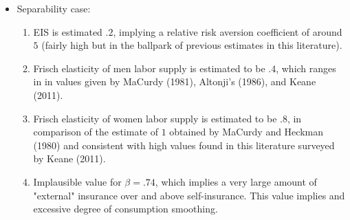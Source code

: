 \documentclass[notes=show]{beamer}
\begin{document}
\bigskip

\begin{frame}%



\begin{itemize}
\item Separability case:

\begin{enumerate}
\item EIS is estimated $.2$, implying a relative risk aversion coefficient
of around $5$ (fairly high but in the ballpark of previous estimates in this
literature).

\item Frisch elasticity of men labor supply is estimated to be $.4$, which
ranges in in values given by MaCurdy (1981), Altonji's (1986), and Keane
(2011).

\item Frisch elasticity of women labor supply is estimated to be $.8$, in
comparison of the estimate of $1$ obtained by MaCurdy and Heckman (1980) and
consistent with high values found in this literature surveyed by Keane
(2011).

\item Implausible value for $\beta =.74$, which implies a very large amount
of "external" insurance over and above self-insurance. This value implies
and excessive degree of consumption smoothing.
\end{enumerate}
\end{itemize}

\transboxout%
\end{frame}%

\bigskip
\end{document}
